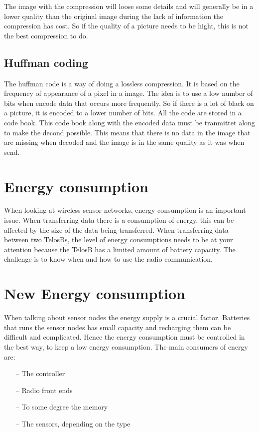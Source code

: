 The image with the compression will loose some details and will generally be in a lower quality than the original image during the lack of information the compression has cost. So if the quality of a picture needs to be hight, this is not the best compression to do.  

\subsection{Huffman coding}
The huffman code is a way of doing a lossless compression. It is based on the frequency of appearance of a pixel in a image. The idea is to use a low number of bits when encode data that occurs more frequently. So if there is a lot of black on a picture, it is encoded to a lower number of bits. All the code are stored in a code book. This code book along with the encoded data must be tranmittet along to make the decond possible. This means that there is no data in the image that are missing when decoded and the image is in the same quality as it was when send.

\section{Energy consumption}
When looking at wireless sensor networks, energy consumption is an important issue. When transferring data there is a consumption of energy, this can be affected by the size of the data being transferred. When transferring data between two TelosBs, the level of energy consumptions needs to be at your attention because the TelosB has a limited amount of battery capacity. The challenge is to know when and how to use the radio communication.

\section{New Energy consumption}
When talking about sensor nodes the energy supply is a crucial factor. Batteries that runs the sensor nodes has small capacity and recharging them can be difficult and complicated. Hence the energy consumption must be controlled in the best way, to keep a low energy consumption.
The main consumers of energy are:
\begin{itemize}
	\item[--] The controller
	\item[--] Radio front ends
	\item[--] To some degree the memory
	\item[--] The sensors, depending on the type
\end{itemize}
	 
